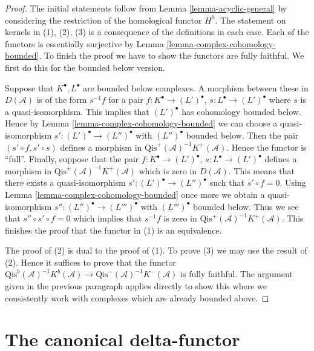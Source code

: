 \begin{proof}
The initial statements follow from
Lemma \ref{lemma-acyclic-general}
by considering the restriction of the homological functor $H^0$.
The statement on kernels in (1), (2), (3) is a consequence of the
definitions in each case.
Each of the functors is essentially surjective by
Lemma \ref{lemma-complex-cohomology-bounded}.
To finish the proof we have to show the functors are fully faithful.
We first do this for the bounded below version.

\medskip\noindent
Suppose that $K^\bullet, L^\bullet$ are bounded below complexes.
A morphism between these in $D(\mathcal{A})$ is of the form
$s^{-1}f$ for a pair
$f : K^\bullet \to (L')^\bullet$, $s : L^\bullet \to (L')^\bullet$
where $s$ is a quasi-isomorphism. This implies that $(L')^\bullet$
has cohomology bounded below. Hence by
Lemma \ref{lemma-complex-cohomology-bounded}
we can choose a quasi-isomorphism
$s' : (L')^\bullet \to (L'')^\bullet$
with $(L'')^\bullet$ bounded below. Then the pair $(s' \circ f, s' \circ s)$
defines a morphism in $\text{Qis}^{+}(\mathcal{A})^{-1}K^{+}(\mathcal{A})$.
Hence the functor is ``full''. Finally, suppose that the pair
$f : K^\bullet \to (L')^\bullet$, $s : L^\bullet \to (L')^\bullet$
defines a morphism in $\text{Qis}^{+}(\mathcal{A})^{-1}K^{+}(\mathcal{A})$
which is zero in $D(\mathcal{A})$. This means that there exists a
quasi-isomorphism $s' : (L')^\bullet \to (L'')^\bullet$
such that $s' \circ f = 0$. Using
Lemma \ref{lemma-complex-cohomology-bounded}
once more we obtain a quasi-isomorphism
$s'' : (L'')^\bullet \to (L''')^\bullet$
with $(L''')^\bullet$ bounded below.
Thus we see that $s'' \circ s' \circ f = 0$ which implies that
$s^{-1}f$ is zero in $\text{Qis}^{+}(\mathcal{A})^{-1}K^{+}(\mathcal{A})$.
This finishes the proof that the functor in (1) is an equivalence.

\medskip\noindent
The proof of (2) is dual to the proof of (1).
To prove (3) we may use the result of (2). Hence it suffices to
prove that the functor
$\text{Qis}^b(\mathcal{A})^{-1}K^b(\mathcal{A})
\to \text{Qis}^{-}(\mathcal{A})^{-1}K^{-}(\mathcal{A})$
is fully faithful. The argument given in the previous paragraph
applies directly to show this where we consistently work with complexes
which are already bounded above.
\end{proof}







\section{The canonical delta-functor}
\label{section-canonical-delta-functor}

